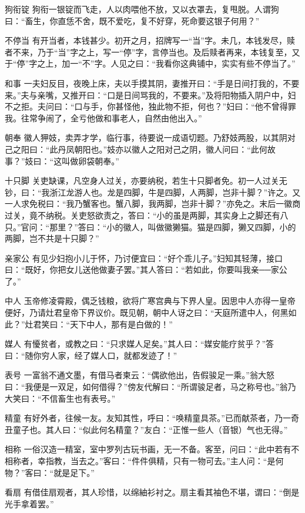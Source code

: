 \documentclass[12pt,UTF8]{ctexbook}
\begin{document}
狗衔锭
狗衔一银锭而飞走，人以肉喂他不放，又以衣罩去，复甩脱。人谓狗曰：“畜生，你直恁不舍，既不爱吃，复不好穿，死命要这银子何用？”

不停当
有开当者，本钱甚少。初开之月，招牌写一“当”字。未几，本钱发尽，赎者不来，乃于“当”字之上，写一“停”字，言停当也。及后赎者再来，本钱复至，又于“停”字之上，加一“不”字。人见之曰：“我看你这典铺中，实实有些不停当了。”

和事
一夫妇反目，夜晚上床，夫以手摸其阴，妻推开曰：“手是日间打我的，不要来。”夫与亲嘴，又推开曰：“口是日间骂我的，不要来。”及将阳物插入阴户中，妇不之拒。夫问曰：“口与手，你甚怪他，独此物不拒，何也？”妇曰：“他不曾得罪我。往常争闹了，全亏他做和事老人，自然由他出入。”

朝奉
徽人狎妓，卖弄才学，临行事，待要说一成语切题。乃舒妓两股，以其阴对己之阳曰：“此丹凤朝阳也。”妓亦以徽人之阳对己之阴，徽人问曰：“此何故事？”妓曰：“这叫做卵袋朝奉。”

十只脚
关吏缺课，凡空身人过关，亦要纳税，若生十只脚者免。初一人过关无钞，曰：“我浙江龙游人也。龙是四脚，牛是四脚，人两脚，岂非十脚？”许之。又一人求免税曰：“我乃蟹客也。蟹八脚，我两脚，岂非十脚？”亦免之。末后一徽商过关，竟不纳税。关吏怒欲责之，答曰：“小的虽是两脚，其实身上之脚还有八只。”官问：“那里？”答曰：“小的徽人，叫做徽獭猫。猫是四脚，獭又四脚，小的两脚，岂不共是十只脚？”

亲家公
有见少妇抱小儿于怀，乃讨便宜曰：“好个乖儿子。”妇知其轻薄，接口曰：“既好，你把女儿送他做妻子罢。”其人答曰：“若如此，你要叫我亲──家公了。”

中人
玉帝修凌霄殿，偶乏钱粮，欲将广寒宫典与下界人皇。因思中人亦得一皇帝便好，乃请灶君皇帝下界议价。既见朝，朝中人讶之曰：“天庭所遣中人，何黑如此？”灶君笑曰：“天下中人，那有是白做的！”

媒人
有懮贫者，或教之曰：“只求媒人足矣。”其人曰：“媒安能疗贫乎？”答曰：“随你穷人家，经了媒人口，就都发迹了！”

表号
一富翁不通文墨，有借马者柬云：“偶欲他出，告假骏足一乘。”翁大怒曰：“我便是一双足，如何借得？”傍友代解曰：“所谓骏足者，马之称号也。”翁乃大笑曰：“不信畜生也有表号。”

精童
有好外者，往候一友。友知其性，呼曰：“唤精童具茶。”已而献茶者，乃一奇丑童子也。其人曰：“似此何名精童？”友白：“正惟一些人（音银）气也无得。”

相称
一俗汉造一精室，室中罗列古玩书画，无一不备。客至，问曰：“此中若有不相称者，幸指教，当去之。”客曰：“件件俱精，只有一物可去。”主人问：“是何物？”客曰：“就是足下。”

看扇
有借佳扇观者，其人珍惜，以绵紬衫衬之。扇主看其袖色不堪，谓曰：“倒是光手拿着罢。”
\end{document}
